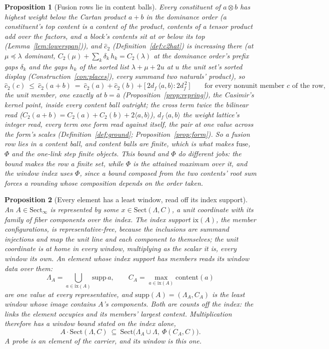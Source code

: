 \documentclass[11pt]{article}
\newtheorem{proposition}{Proposition}
\theoremstyle{definition}
\begin{document}
\begin{proposition}[Fusion rows lie in content balls]\label{prop:fusionfinite}
Every constituent of $a\otimes b$ has
highest weight below the Cartan product $a+b$ in the dominance order (a
constituent's top content is a content of the product, contents of a
tensor product add over the factors, and a block's contents sit at or
below its top (Lemma~\ref{lem:lowerspan})), and
$\hat c_2$ (Definition~\ref{def:c2hat}) is increasing there (at
$\mu\preceq\lambda$ dominant,
$C_2(\mu)+\sum_k\delta_k\,h_k=C_2(\lambda)$ at the dominance order's
prefix gaps $\delta_k$ and the gaps $h_k$ of the sorted list
$\lambda+\mu+2u$ at $u$ the unit set's sorted display
(Construction~\ref{con:places}), every summand two naturals' product), so
\[
\hat c_2(c)\ \le\ \hat c_2(a+b)\ =\ \hat c_2(a)+\hat c_2(b)
+\big[\,2d_f\,\langle a,b\rangle:2d_f^{\,2}\,\big]
\qquad\text{for every nonunit member }c\text{ of the row},
\]
the unit member, one exactly at $b=\bar a$
(Proposition~\ref{prop:repring}), the Casimir's kernel point, inside
every content ball outright;
the cross term twice the bilinear read
($C_2(a+b)=C_2(a)+C_2(b)+2\langle a,b\rangle$),
$d_f\,\langle a,b\rangle$ the weight lattice's integer read, every term
one form read against itself, the pair at one value across the
form's scales
(Definition~\ref{def:ground}; Proposition~\ref{prop:form}).
So a fusion row lies in a content ball, and content balls are finite, which is
what makes $\mathrm{fuse}$, $\Phi$ and the one-link step
finite objects. This bound and $\Phi$ do different jobs: the bound
makes the row a finite set, while $\Phi$ is the \emph{attained} maximum over it,
and the window index uses $\Phi$, since a bound composed from the two
contents' root sum forces a rounding whose composition depends on the order
taken.
\end{proposition}

\begin{proposition}[Every element has a least window, read off its index
support]\label{prop:leastwindow}
An
$A\in\mathrm{Sect}_\infty$ is represented by some $x\in\mathrm{Sect}(\Lambda,C)$,
a unit coordinate with its family of fiber components over the
index. The \emph{index support}
$\mathrm{ix}(A)$, the member configurations, is representative-free,
because the
inclusions are summand injections and map the unit line and each
component to themselves; the unit coordinate is at home in every
window, multiplying as the scalar it is, every window its own. An
element whose index support has members reads its window data over
them:
\[
\Lambda_A=\bigcup_{a\in\mathrm{ix}(A)}\mathrm{supp}\,a ,
\qquad
C_A=\max_{a\in\mathrm{ix}(A)}\mathrm{content}(a)
\]
are one value at every representative, and
$\mathrm{supp}(A)=(\Lambda_A,C_A)$ is the least window whose
image contains $A$'s components. Both are \emph{counts off the index}: the links the element
occupies and its members' largest content. Multiplication therefore has a
window bound stated on the index alone,
\[
A\cdot\mathrm{Sect}(\Lambda,C)\ \subseteq\
\mathrm{Sect}\big(\Lambda_A\cup\Lambda,\ \Phi(C_A,C)\big).
\]
A probe is an element of the
carrier, and its window is this one.
\end{proposition}
\end{document}
